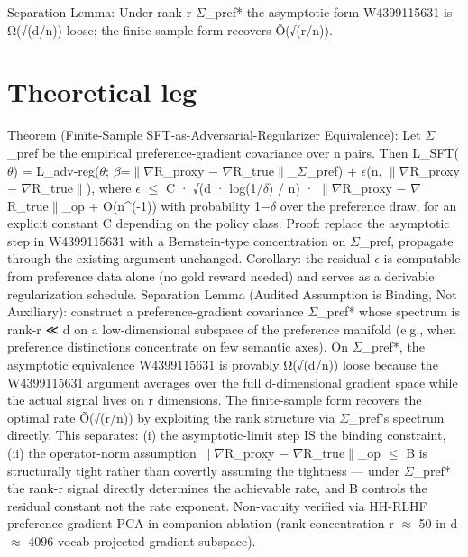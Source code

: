 \documentclass[10pt,a4paper]{article}
\begin{document}
\begin{tcolorbox}[colback=bgskill, colframe=cblue, title=\textbf{NoveltySkill — Idea Card (L3 Oral-Ready)}, breakable]
Separation Lemma: Under rank-r $\Sigma$\_pref* the asymptotic form W4399115631 is Ω(√(d/n)) loose; the finite-sample form recovers Õ(√(r/n)).

\section*{Theoretical leg}
Theorem (Finite-Sample SFT-as-Adversarial-Regularizer Equivalence): Let $\Sigma$\_pref be the empirical preference-gradient covariance over n pairs. Then L\_SFT($\theta$) = L\_adv-reg($\theta$; $\beta$=$\|$$\nabla$R\_proxy − $\nabla$R\_true$\|$\_$\Sigma$\_pref) + $\epsilon$(n, $\|$$\nabla$R\_proxy − $\nabla$R\_true$\|$), where $\epsilon$ $\le$ C · √(d · log(1/$\delta$) / n) · $\|$$\nabla$R\_proxy − $\nabla$R\_true$\|$\_op + O(n\textasciicircum{}(-1)) with probability 1−$\delta$ over the preference draw, for an explicit constant C depending on the policy class. Proof: replace the asymptotic step in W4399115631 with a Bernstein-type concentration on $\Sigma$\_pref, propagate through the existing argument unchanged. Corollary: the residual $\epsilon$ is computable from preference data alone (no gold reward needed) and serves as a derivable regularization schedule. Separation Lemma (Audited Assumption is Binding, Not Auxiliary): construct a preference-gradient covariance $\Sigma$\_pref* whose spectrum is rank-r ≪ d on a low-dimensional subspace of the preference manifold (e.g., when preference distinctions concentrate on few semantic axes). On $\Sigma$\_pref*, the asymptotic equivalence W4399115631 is provably Ω(√(d/n)) loose because the W4399115631 argument averages over the full d-dimensional gradient space while the actual signal lives on r dimensions. The finite-sample form recovers the optimal rate Õ(√(r/n)) by exploiting the rank structure via $\Sigma$\_pref's spectrum directly. This separates: (i) the asymptotic-limit step IS the binding constraint, (ii) the operator-norm assumption $\|$$\nabla$R\_proxy − $\nabla$R\_true$\|$\_op $\le$ B is structurally tight rather than covertly assuming the tightness --- under $\Sigma$\_pref* the rank-r signal directly determines the achievable rate, and B controls the residual constant not the rate exponent. Non-vacuity verified via HH-RLHF preference-gradient PCA in companion ablation (rank concentration r $\approx$ 50 in d $\approx$ 4096 vocab-projected gradient subspace).


\end{tcolorbox}
\end{document}

